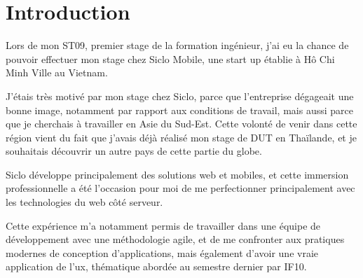 \documentclass[rapport.tex]{subfiles}
\begin{document}
    \section*{Introduction}
    Lors de mon ST09, premier stage de la formation ingénieur,
    j'ai eu la chance de pouvoir effectuer mon stage chez Siclo Mobile,
    une start up établie à Hô Chi Minh Ville au Vietnam.

    J'étais très motivé par mon stage chez Siclo, parce que l'entreprise dégageait une bonne image, notamment par rapport aux conditions de travail, mais aussi parce que je cherchais à travailler en Asie du Sud-Est. Cette volonté de venir dans cette région vient du fait que j'avais déjà réalisé mon stage
    de DUT en Thaïlande, et je souhaitais découvrir un autre pays de cette partie du globe.

    Siclo développe principalement des solutions web et mobiles, et cette immersion professionnelle a été l'occasion pour moi de me perfectionner principalement avec les technologies du web côté serveur.

    Cette expérience m'a notamment permis de travailler dans une équipe de développement avec une méthodologie agile, et de me confronter aux pratiques modernes de conception d'applications, mais également d'avoir une vraie application de l'\gls{ux}, thématique abordée au semestre dernier par IF10.
\end{document}
